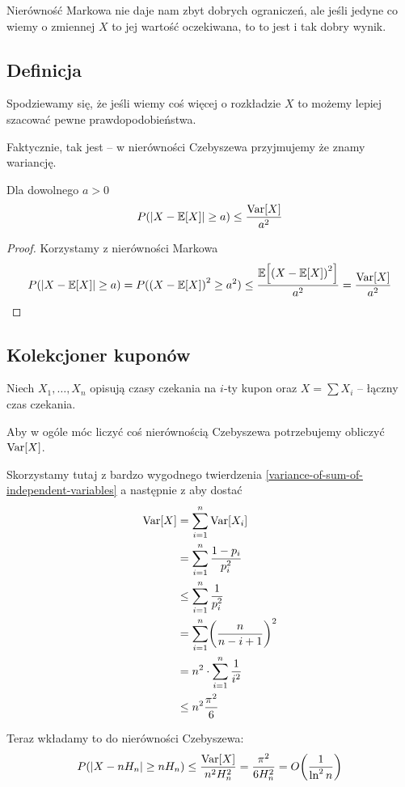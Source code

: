 Nierówność Markowa nie daje nam zbyt dobrych ograniczeń, ale jeśli jedyne co wiemy o zmiennej \( X \) to jej wartość oczekiwana, to to jest i tak dobry wynik.
\subsection{Definicja}
Spodziewamy się, że jeśli wiemy coś więcej o rozkładzie \( X \) to możemy lepiej szacować pewne prawdopodobieństwa.

Faktycznie, tak jest -- w nierówności Czebyszewa przyjmujemy że znamy wariancję.

\begin{theorem}[Twierdzenie 3.6 P\&C]
    Dla dowolnego \( a > 0 \)
    \[
        P(\abs{X - \expected{X}} \geq a) \leq \frac{\variance{X}}{a^2}
    \]
\end{theorem}
\begin{proof}
Korzystamy z nierówności Markowa
    \[
        P(\abs{X - \expected{X}} \geq a) = P(\pars{X - \expected{X}}^2 \geq a^2) 
        \leq \frac{\expected{\pars{X - \expected{X}}^2}}{a^2} = \frac{\variance{X}}{a^2}
    \]
\end{proof}

\subsection{Kolekcjoner kuponów}
Niech \( X_1, \dots, X_n \) opisują czasy czekania na \( i \)-ty kupon oraz \( X = \sum X_i \) -- łączny czas czekania.

Aby w ogóle móc liczyć coś nierównością Czebyszewa potrzebujemy obliczyć \( \variance{X} \).

Skorzystamy tutaj z bardzo wygodnego twierdzenia \ref{variance-of-sum-of-independent-variables} 
a następnie z aby dostać
\begin{align*}
    \variance{X} 
        &= \sum_{i=1}^n \variance{X_i}  \\
        &= \sum_{i=1}^n \frac{1 - p_i}{p_i^2} \\
        &\leq \sum_{i=1}^n \frac{1}{p_i^2} \\
        &=\sum_{i=1}^n \pars{\frac{n}{n-i+1}}^2 \\
        &=n^2 \cdot \sum_{i=1}^n \frac{1}{i^2} \\
        &\leq n^2\frac{\pi^2}{6}
\end{align*}

Teraz wkładamy to do nierówności Czebyszewa:
\[
    P(\abs{X - nH_n} \geq nH_n) \leq \frac{\variance{X}}{n^2H_n^2} = \frac{\pi^2}{6H_n^2} = O\pars{\frac{1}{\ln^2 n}}
\]
